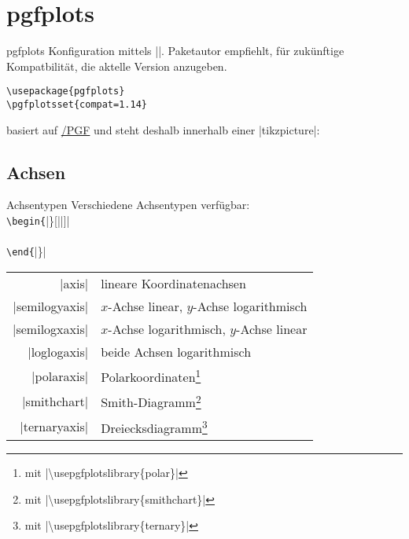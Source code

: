 \documentclass[
	vorläufig=true,
	datum=2016-12-02,
	titel={Diagramme},
	web=false,
]{../tex/latexkurs-slides}
\begin{document}
\section{pgfplots}
\begin{frame}[fragile]{pgfplots}
Konfiguration mittels ||. Paketautor empfiehlt, für zukünftige Kompatbilität, die aktelle Version anzugeben.
\begin{lstlisting}
\usepackage{pgfplots}
\pgfplotsset{compat=1.14}
\end{lstlisting}
\pause
{} basiert auf \href{http://ctan.org/pkg/pgf}{\TikZ/PGF} und steht deshalb innerhalb einer |tikzpicture|:
\begingroup
\pgfplotsset{scale=0.5}
\begin{LTXexample}[pos=r, explpreset={}, preset=, rframe={}]
\end{LTXexample}
\endgroup
\end{frame}


\subsection{Achsen}
\begin{frame}{Achsentypen}
Verschiedene Achsentypen verfügbar: \\[1em]
\texttt{\textbackslash begin\{}|\}[||]|\\
\quad{}\\
\texttt{\textbackslash end\{}|\}|

\vfill

\begin{tabular}{rl}
|axis| & lineare Koordinatenachsen\\
|semilogyaxis| & $x$-Achse linear, $y$-Achse logarithmisch\\
|semilogxaxis| & $x$-Achse logarithmisch, $y$-Achse linear\\
|loglogaxis| & beide Achsen logarithmisch\\
|polaraxis| & Polarkoordinaten\footnote{mit |\textbackslash usepgfplotslibrary\{polar\}|}\\
|smithchart| & Smith-Diagramm\footnote{mit |\textbackslash usepgfplotslibrary\{smithchart\}|}\\
|ternaryaxis| & Dreiecksdiagramm\footnote{mit |\textbackslash usepgfplotslibrary\{ternary\}|}
\end{tabular}
\end{frame}
\end{document}
